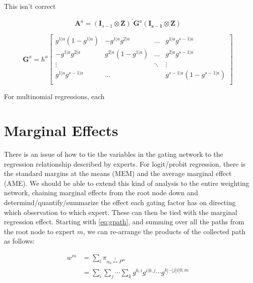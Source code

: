 \documentclass[12pt]{article}
\begin{document}
\bigskip

This isn't correct

\begin{equation} \label{eq:gatinghessianQ}
  \mathbf{A}^{a} = (\mathbf{I}_{s-1} \otimes \mathbf{Z})^{\prime} \mathbf{G}^{a} (\mathbf{I_{s-1}} \otimes \mathbf{Z})
\end{equation}

\begin{equation} \label{eq:nodehessian}
  \mathbf{G}^{a} = h^{a} \begin{bmatrix}
     g^{1|a}(1-g^{1|a}) & -g^{1|a}g^{2|a}    & \dots  & g^{1|a}g^{s-1|a}       \\
     -g^{1|a}g^{2|a}    & g^{2|a}(1-g^{1|a}) & \dots  & g^{2|a}g^{s-1|a}       \\
     \vdots             &                    & \ddots & \vdots                 \\
     g^{1|a}g^{s-1|a}   &  \dots             &        & g^{s-1|a}(1-g^{s-1|a}) \\
  \end{bmatrix}
\end{equation}

For multinomial regressions, each 



\section{Marginal Effects} \label{sec:MarginalEffects}
There is an issue of how to tie the variables in the gating network to the regression
relationship described by experts. For logit/probit regression, there is the
standard margins at the means (MEM) and the average marginal effect (AME). We should
be able to extend this kind of analysis to the entire weighting network, chaining
marginal effects from the root node down and determind/quantify/summarize the effect
each gating factor has on directing which observation to which expert. These can
then be tied with the marginal regression effect. Starting with \ref{eq:gpath},
and summing over all the paths from the root node to expert $m$, we can re-arrange
the products of the collected path as follows:  

\begin{equation}
  \begin{split}
  w^{m} &= \sum_{l} \pi_{n_{0} \overset{l}{\longleftrightarrow} P^{m}} \\
        &= \sum_{i} \sum_{j} \cdots \sum_{k} g^{0, i} g^{i|0, j} \cdots g^{k|\cdots|j|i|0, m} \\
  \end{split}
\end{equation}
\end{document}
